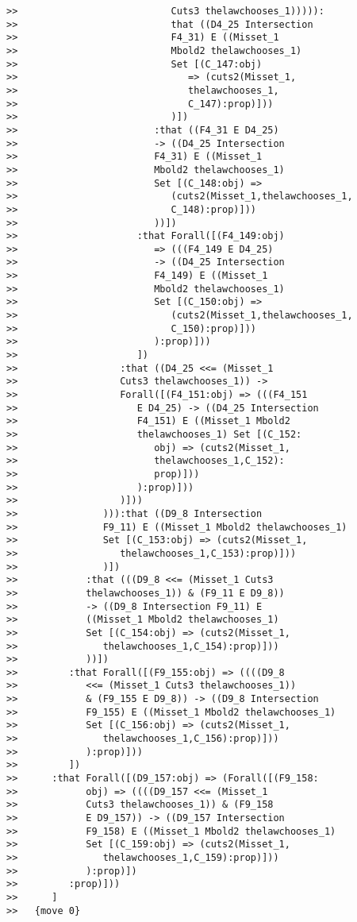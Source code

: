 \documentclass[12pt]{article}
\begin{document}
\begin{verbatim}
>>                           Cuts3 thelawchooses_1))))):
>>                           that ((D4_25 Intersection
>>                           F4_31) E ((Misset_1
>>                           Mbold2 thelawchooses_1)
>>                           Set [(C_147:obj)
>>                              => (cuts2(Misset_1,
>>                              thelawchooses_1,
>>                              C_147):prop)]))
>>                           )])
>>                        :that ((F4_31 E D4_25)
>>                        -> ((D4_25 Intersection
>>                        F4_31) E ((Misset_1
>>                        Mbold2 thelawchooses_1)
>>                        Set [(C_148:obj) =>
>>                           (cuts2(Misset_1,thelawchooses_1,
>>                           C_148):prop)]))
>>                        ))])
>>                     :that Forall([(F4_149:obj)
>>                        => (((F4_149 E D4_25)
>>                        -> ((D4_25 Intersection
>>                        F4_149) E ((Misset_1
>>                        Mbold2 thelawchooses_1)
>>                        Set [(C_150:obj) =>
>>                           (cuts2(Misset_1,thelawchooses_1,
>>                           C_150):prop)]))
>>                        ):prop)]))
>>                     ])
>>                  :that ((D4_25 <<= (Misset_1
>>                  Cuts3 thelawchooses_1)) ->
>>                  Forall([(F4_151:obj) => (((F4_151
>>                     E D4_25) -> ((D4_25 Intersection
>>                     F4_151) E ((Misset_1 Mbold2
>>                     thelawchooses_1) Set [(C_152:
>>                        obj) => (cuts2(Misset_1,
>>                        thelawchooses_1,C_152):
>>                        prop)]))
>>                     ):prop)]))
>>                  )]))
>>               ))):that ((D9_8 Intersection
>>               F9_11) E ((Misset_1 Mbold2 thelawchooses_1)
>>               Set [(C_153:obj) => (cuts2(Misset_1,
>>                  thelawchooses_1,C_153):prop)]))
>>               )])
>>            :that (((D9_8 <<= (Misset_1 Cuts3
>>            thelawchooses_1)) & (F9_11 E D9_8))
>>            -> ((D9_8 Intersection F9_11) E
>>            ((Misset_1 Mbold2 thelawchooses_1)
>>            Set [(C_154:obj) => (cuts2(Misset_1,
>>               thelawchooses_1,C_154):prop)]))
>>            ))])
>>         :that Forall([(F9_155:obj) => ((((D9_8
>>            <<= (Misset_1 Cuts3 thelawchooses_1))
>>            & (F9_155 E D9_8)) -> ((D9_8 Intersection
>>            F9_155) E ((Misset_1 Mbold2 thelawchooses_1)
>>            Set [(C_156:obj) => (cuts2(Misset_1,
>>               thelawchooses_1,C_156):prop)]))
>>            ):prop)]))
>>         ])
>>      :that Forall([(D9_157:obj) => (Forall([(F9_158:
>>            obj) => ((((D9_157 <<= (Misset_1
>>            Cuts3 thelawchooses_1)) & (F9_158
>>            E D9_157)) -> ((D9_157 Intersection
>>            F9_158) E ((Misset_1 Mbold2 thelawchooses_1)
>>            Set [(C_159:obj) => (cuts2(Misset_1,
>>               thelawchooses_1,C_159):prop)]))
>>            ):prop)])
>>         :prop)]))
>>      ]
>>   {move 0}



\end{verbatim}
\end{document}
